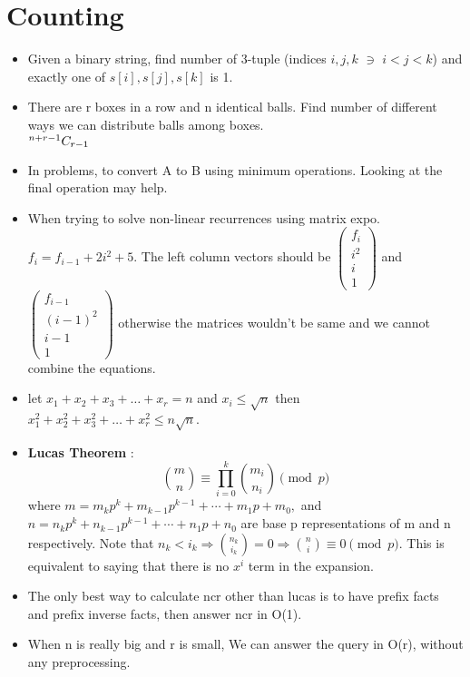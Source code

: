 \documentclass[../Notes.tex]{subfiles}
\begin{document}
\chapter{Counting}

\begin{itemize}
	\item Given a binary string, find number of 3-tuple (indices $i,j,k$ $\ni$ $i<j<k$) and exactly one of $s[i],s[j],s[k]$ is 1. 
	\item There are r boxes in a row and n identical balls. Find number of different ways we can distribute balls among boxes.\\
	${}^{n+r-1}C_{r-1}$
	\item In problems, to convert A to B using minimum operations. Looking at the final operation may help.
	\item When trying to solve non-linear recurrences using matrix expo.
	$f_i = f_{i - 1} + 2i^2 + 5$. The left column vectors should be
	$\begin{pmatrix} f_i\\ i^2\\ i\\ 1\end{pmatrix}$ and $\begin{pmatrix} f_{i-1}\\ (i-1)^2\\ i-1\\ 1\end{pmatrix}$ otherwise the matrices wouldn't be same and we cannot combine the equations.
	\item let $x_1+x_2+x_3+ \ldots +x_r = n$ and $x_i\leq \sqrt{n}$ then 
	$x_1^2+x_2^2+x_3^2+ \ldots +x_r^2 \leq n\sqrt{n}$.
	\item \textbf{Lucas Theorem} : $${\binom {m}{n}}\equiv \prod _{i=0}^{k}{\binom {m_{i}}{n_{i}}}{\pmod {p}}$$
	where $m=m_{k}p^{k}+m_{k-1}p^{k-1}+\cdots +m_{1}p+m_{0},$ and\\ 
	$n=n_{k}p^{k}+n_{k-1}p^{k-1}+\cdots +n_{1}p+n_{0}$ are base p representations of m and n respectively. Note that 
	$n_k<i_k\Longrightarrow\binom{n_k}{i_k}=0\Longrightarrow\binom{n}{i}\equiv 0 \pmod{p}$. This is equivalent to saying that there is no $x^i$ term in the expansion.
	\item The only best way to calculate ncr other than lucas is to have prefix facts and prefix inverse facts, then answer ncr in O(1).
	\item When n is really big and r is small, We can answer the query in O(r), without any preprocessing.
\end{itemize}
\end{document}
